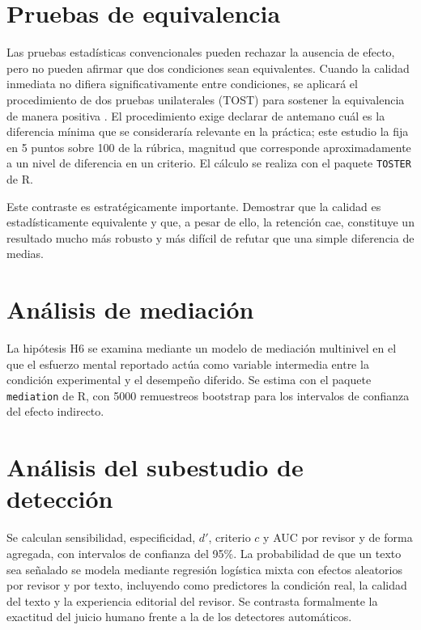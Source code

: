 \documentclass[12pt,a4paper,openany]{report}
\begin{document}
    \section{Pruebas de equivalencia}
    
    Las pruebas estad\'isticas convencionales pueden rechazar la ausencia de efecto, pero no pueden afirmar que dos condiciones sean equivalentes. Cuando la calidad inmediata no difiera significativamente entre condiciones, se aplicar\'a el procedimiento de dos pruebas unilaterales (TOST) para sostener la equivalencia de manera positiva \citep{lakens2018equivalence}. El procedimiento exige declarar de antemano cu\'al es la diferencia m\'inima que se considerar\'ia relevante en la pr\'actica; este estudio la fija en 5 puntos sobre 100 de la r\'ubrica, magnitud que corresponde aproximadamente a un nivel de diferencia en un criterio. El c\'alculo se realiza con el paquete \texttt{TOSTER} de R.
    
    Este contraste es estrat\'egicamente importante. Demostrar que la calidad es estad\'isticamente equivalente y que, a pesar de ello, la retenci\'on cae, constituye un resultado mucho m\'as robusto y m\'as dif\'icil de refutar que una simple diferencia de medias.
    
    \section{An\'alisis de mediaci\'on}
    
    La hip\'otesis H6 se examina mediante un modelo de mediaci\'on multinivel en el que el esfuerzo mental reportado act\'ua como variable intermedia entre la condici\'on experimental y el desempe\~no diferido. Se estima con el paquete \texttt{mediation} de R, con 5000 remuestreos bootstrap para los intervalos de confianza del efecto indirecto.
    
    \section{An\'alisis del subestudio de detecci\'on}
    
    Se calculan sensibilidad, especificidad, $d'$, criterio $c$ y AUC por revisor y de forma agregada, con intervalos de confianza del 95\%. La probabilidad de que un texto sea se\~nalado se modela mediante regresi\'on log\'istica mixta con efectos aleatorios por revisor y por texto, incluyendo como predictores la condici\'on real, la calidad del texto y la experiencia editorial del revisor. Se contrasta formalmente la exactitud del juicio humano frente a la de los detectores autom\'aticos.
    
\end{document}
